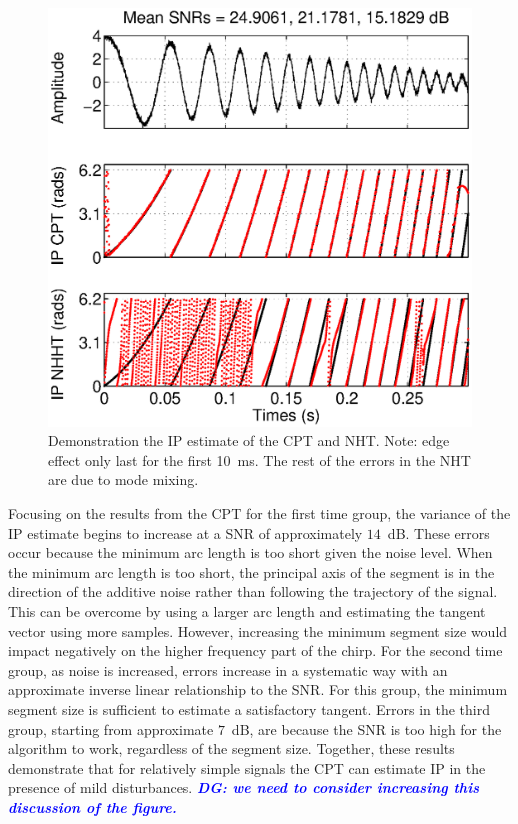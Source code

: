 \documentclass[journal,11pt,a4paper,onecolumn,draftcls]{IEEEtran}
\newcommand{\todo}[1]{\textsf{\emph{\textbf{\textcolor{blue}{#1}}}}}
\begin{document}
\begin{figure}\label{CPTandNHTTogether}
    \centering
        \includegraphics[scale=0.42]{./Figures/CPTandNHHT_IPs_together.eps}
    \caption{Demonstration the IP estimate of the CPT and NHT. Note: edge effect only last for the first 10~ms. The rest of the errors in the NHT are due to mode mixing. }
\end{figure}

Focusing on the results from the CPT for the first time group, the variance of the IP estimate begins to increase at a SNR of approximately $14$~dB. These errors occur because the minimum arc length is too short given the noise level. When the minimum arc length is too short, the principal axis of the segment is in the direction of the additive noise rather than following the trajectory of the signal. This can be overcome by using a larger arc length and estimating the tangent vector using more samples. However, increasing the minimum segment size would impact negatively on the higher frequency part of the chirp. For the second time group, as noise is increased, errors increase in a systematic way with an approximate inverse linear relationship to the SNR. For this group, the minimum segment size is sufficient to estimate a satisfactory tangent. Errors in the third group, starting from approximate $7$~dB, are because the SNR is too high for the algorithm to work, regardless of the segment size. Together, these results demonstrate that for relatively simple signals the CPT can estimate IP in the presence of mild disturbances. \todo{DG: we need to consider increasing this discussion of the figure.}
\end{document}
